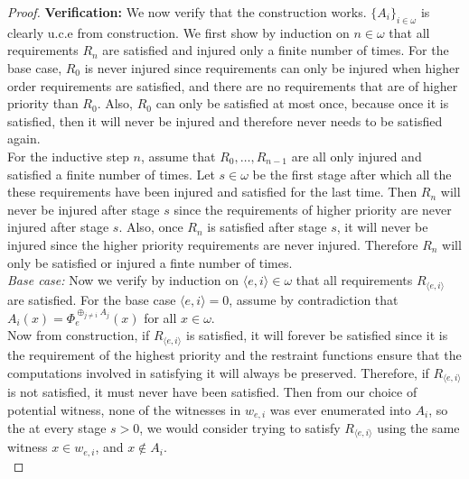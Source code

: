 \documentclass{article}
\begin{document}
\begin{enumerate}[label={(\roman*)}]
\begin{proof}
        \textbf{Verification:} We now verify that the construction works.
        $\{A_i\}_{i\in\omega}$ is clearly u.c.e from construction. We first
        show by induction on $n\in\omega$ that all
        requirements $R_{n}$ are satisfied and injured
        only a finite number of times. For the base case, $R_0$ is never
        injured since requirements can only be injured when higher order
        requirements are satisfied, and there are no requirements that are
        of higher priority than $R_0$. Also, $R_0$ can only be satisfied at
        most once, because once it is satisfied, then it will never be
        injured and therefore never needs to be satisfied again. \\

        For the inductive step $n$, assume that $R_0,\ldots,R_{n-1}$ are
        all only injured and satisfied a finite number of times. Let
        $s\in\omega$ be the first stage after which all the these
        requirements have been injured and satisfied for the last time.
        Then $R_n$ will never be injured after stage $s$ since the
        requirements of higher priority are never injured after stage $s$.
        Also, once $R_n$ is satisfied after stage $s$, it will never be
        injured since the higher priority requirements are never injured.
        Therefore $R_n$ will only be satisfied or injured a finte number of
        times. \\

        \textit{Base case:} Now we verify by induction on $\langle
        e,i\rangle\in\omega$ that all requirements $R_{\langle e,i\rangle}$
        are satisfied. For the base case $\langle e,i\rangle=0$, assume by
        contradiction that $A_i(x)=\Phi_e^{\oplus_{j\neq i} A_j}(x)$ for
        all $x\in\omega$. \\

        Now from construction, if $R_{\langle e,i\rangle}$ is satisfied, it
        will forever be satisfied since it is the requirement of the
        highest priority and the restraint functions ensure that the
        computations involved in satisfying it will always be preserved.
        Therefore, if $R_{\langle e,i\rangle}$ is not satisfied, it must
        never have been satisfied. Then from our choice of potential
        witness, none of the witnesses in $w_{e,i}$ was ever enumerated
        into $A_i$, so the at every stage $s>0$, we would consider trying
        to satisfy $R_{\langle e,i\rangle}$ using the same witness $x\in
        w_{e,i}$, and $x\not\in A_i$. \\


\end{proof}
\end{enumerate}
\end{document}
